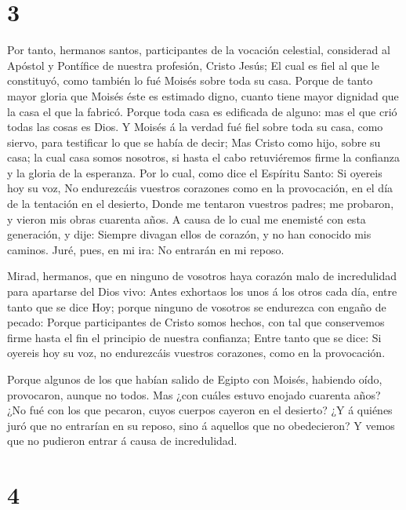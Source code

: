 \hypertarget{section-2}{%
\section{3}\label{section-2}}

 Por tanto, hermanos santos, participantes de la vocación
celestial, considerad al Apóstol y Pontífice de nuestra profesión,
Cristo Jesús;  El cual es fiel al que le constituyó, como
también lo fué Moisés sobre toda su casa.  Porque de tanto
mayor gloria que Moisés éste es estimado digno, cuanto tiene mayor
dignidad que la casa el que la fabricó.  Porque toda casa es
edificada de alguno: mas el que crió todas las cosas es Dios.
 Y Moisés á la verdad fué fiel sobre toda su casa, como
siervo, para testificar lo que se había de decir;  Mas
Cristo como hijo, sobre su casa; la cual casa somos nosotros, si hasta
el cabo retuviéremos firme la confianza y la gloria de la esperanza.
 Por lo cual, como dice el Espíritu Santo: Si oyereis hoy su
voz,  No endurezcáis vuestros corazones como en la
provocación, en el día de la tentación en el desierto, 
Donde me tentaron vuestros padres; me probaron, y vieron mis obras
cuarenta años.  A causa de lo cual me enemisté con esta
generación, y dije: Siempre divagan ellos de corazón, y no han conocido
mis caminos.  Juré, pues, en mi ira: No entrarán en mi
reposo.

 Mirad, hermanos, que en ninguno de vosotros haya corazón
malo de incredulidad para apartarse del Dios vivo:  Antes
exhortaos los unos á los otros cada día, entre tanto que se dice Hoy;
porque ninguno de vosotros se endurezca con engaño de pecado:
 Porque participantes de Cristo somos hechos, con tal que
conservemos firme hasta el fin el principio de nuestra confianza;
 Entre tanto que se dice: Si oyereis hoy su voz, no
endurezcáis vuestros corazones, como en la provocación.

 Porque algunos de los que habían salido de Egipto con
Moisés, habiendo oído, provocaron, aunque no todos.  Mas
¿con cuáles estuvo enojado cuarenta años? ¿No fué con los que pecaron,
cuyos cuerpos cayeron en el desierto?  ¿Y á quiénes juró
que no entrarían en su reposo, sino á aquellos que no obedecieron?
 Y vemos que no pudieron entrar á causa de incredulidad.

\hypertarget{section-3}{%
\section{4}\label{section-3}}

